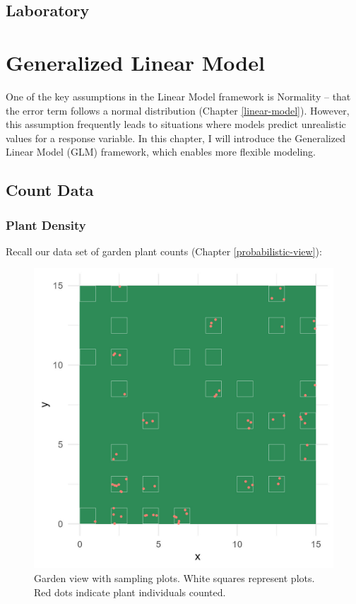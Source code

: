 \documentclass[
]{article}
\begin{document}
\hypertarget{laboratory-6}{%
\subsection{Laboratory}\label{laboratory-6}}

\hypertarget{generalized-linear-model}{%
\section{Generalized Linear Model}\label{generalized-linear-model}}

One of the key assumptions in the Linear Model framework is Normality -- that the error term follows a normal distribution (Chapter \ref{linear-model}). However, this assumption frequently leads to situations where models predict unrealistic values for a response variable. In this chapter, I will introduce the Generalized Linear Model (GLM) framework, which enables more flexible modeling.

\hypertarget{count-data}{%
\subsection{Count Data}\label{count-data}}

\hypertarget{plant-density}{%
\subsubsection{Plant Density}\label{plant-density}}

Recall our data set of garden plant counts (Chapter \ref{probabilistic-view}):

\begin{figure}

{\centering \includegraphics[width=16.67in]{image/figure_garden} 

}

\caption{Garden view with sampling plots. White squares represent plots. Red dots indicate plant individuals counted.}\label{fig:garden-recall}
\end{figure}
\end{document}
